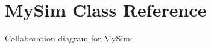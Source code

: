 \hypertarget{classMySim}{}\section{My\+Sim Class Reference}
\label{classMySim}


Collaboration diagram for My\+Sim\+:
